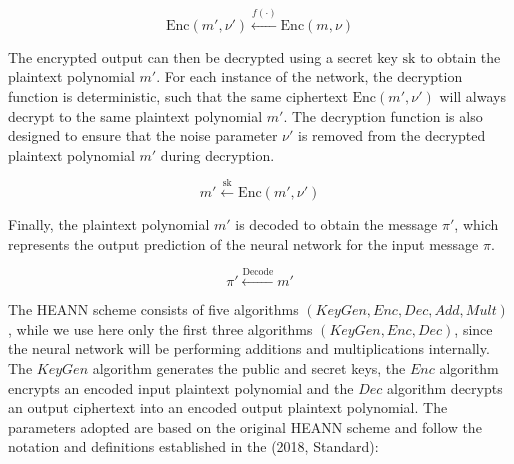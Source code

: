\documentclass{article}
\begin{document}
\[
\text{Enc}(m', \nu') \xleftarrow{f(\cdot)} \text{Enc}(m, \nu)
\]

The encrypted output can then be decrypted using a secret key \(\text{sk}\) to obtain the plaintext polynomial \(m'\). For each instance of the network, the decryption function is deterministic, such that the same ciphertext \(\text{Enc}(m', \nu')\) will always decrypt to the same plaintext polynomial \(m'\). The decryption function is also designed to ensure that the noise parameter \(\nu'\) is removed from the decrypted plaintext polynomial \(m'\) during decryption.

\[
m' \xleftarrow{\text{sk}} \text{Enc}(m', \nu')
\]

Finally, the plaintext polynomial \(m'\) is decoded to obtain the message \(\pi'\), which represents the output prediction of the neural network for the input message \(\pi\).

\[
\pi' \xleftarrow{\text{Decode}} m'
\]

The HEANN scheme consists of five algorithms \((KeyGen, Enc, Dec, Add, Mult)\), while we use here only the first three algorithms \((KeyGen, Enc, Dec)\), since the neural network will be performing additions and multiplications internally. The \(KeyGen\) algorithm generates the public and secret keys, the \(Enc\) algorithm encrypts an encoded input plaintext polynomial and the \(Dec\) algorithm decrypts an output ciphertext into an encoded output plaintext polynomial. The parameters adopted are based on the original HEANN scheme and follow the notation and definitions established in the (2018, Standard):
\end{document}
